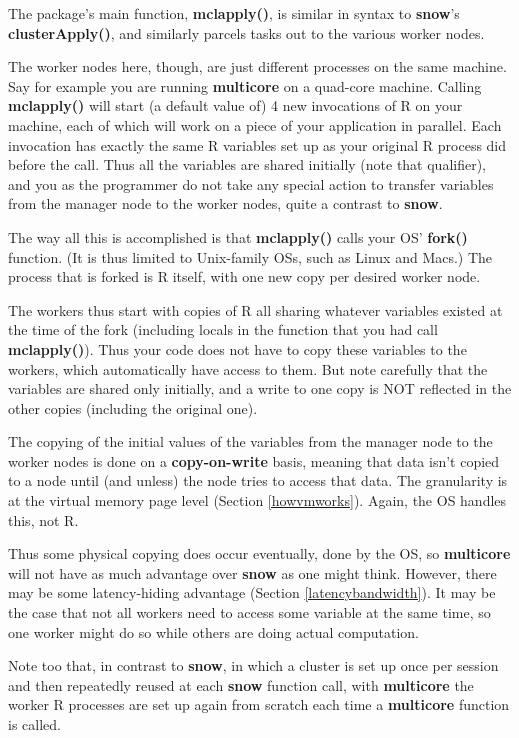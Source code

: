 The package's main function, {\bf mclapply()}, is similar in syntax to
{\bf snow}'s {\bf clusterApply()}, and similarly parcels tasks out to
the various worker nodes.

The worker nodes here, though, are just different processes on the same
machine.  Say for example you are running {\bf multicore} on a quad-core
machine.  Calling {\bf mclapply()} will start (a default value of) 4 new
invocations of R on your machine, each of which will work on a piece of
your application in parallel.  Each invocation has exactly the same R
variables set up as your original R process did before the call.  Thus
all the variables are shared initially (note that qualifier), and you as
the programmer do not take any special action to transfer variables from
the manager node to the worker nodes, quite a contrast to {\bf snow}.

The way all this is accomplished is that {\bf mclapply()} calls your OS'
{\bf fork()} function.  (It is thus limited to Unix-family OSs, such as
Linux and Macs.)  The process that is forked is R itself, with one new
copy per desired worker node.

The workers thus start with copies of R all sharing whatever variables
existed at the time of the fork (including locals in the function that
you had call {\bf mclapply()}).  Thus your code does not have to copy
these variables to the workers, which automatically have access to them.
But note carefully that the variables are shared only initially, and a
write to one copy is NOT reflected in the other copies (including the
original one).

The copying of the initial values of the variables from the manager node
to the worker nodes is done on a {\bf copy-on-write} basis, meaning that
data isn't copied to a node until (and unless) the node tries to access
that data.  The granularity is at the virtual memory page level (Section
\ref{howvmworks}).  Again, the OS handles this, not R.

Thus some physical copying does occur eventually, done by the OS, so
{\bf multicore} will not have as much advantage over {\bf snow} as one
might think.  However, there may be some latency-hiding advantage
(Section \ref{latencybandwidth}).  It may be the case that not all
workers need to access some variable at the same time, so one worker
might do so while others are doing actual computation.

Note too that, in contrast to {\bf snow}, in which a cluster is set up
once per session and then repeatedly reused at each {\bf snow} function
call, with {\bf multicore} the worker R processes are set up again from
scratch each time a {\bf multicore} function is called.

